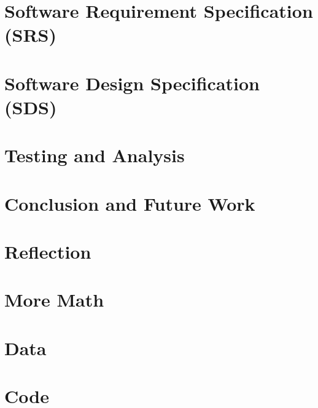 \documentclass[12pt,twosided]{report}
\begin{document}
\chapter{Software Requirement Specification (SRS)}
\label{chap:srs}


\chapter{Software Design Specification (SDS)}
\label{chap:sds}


\chapter{Testing and Analysis}
\label{chap:results}


\chapter{Conclusion and Future Work}
\label{chap:outro}


\chapter{Reflection}
\label{chap:Reflection}


\begin{appendices}

  
\chapter{More Math}


\chapter{Data}


\chapter{Code}

\end{appendices}


\printbibliography
\end{document}
